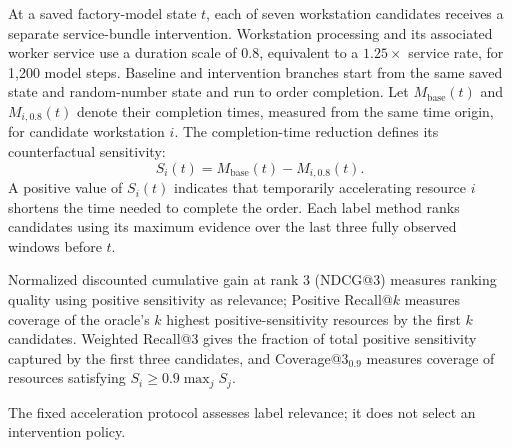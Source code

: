 \documentclass[a4paper,fleqn]{cas-dc}
\begin{document}
At a saved factory-model state $t$, each of seven workstation candidates receives a separate service-bundle intervention. Workstation processing and its associated worker service use a duration scale of $0.8$, equivalent to a $1.25\times$ service rate, for 1,200 model steps. Baseline and intervention branches start from the same saved state and random-number state and run to order completion. Let $M_{\mathrm{base}}(t)$ and $M_{i,0.8}(t)$ denote their completion times, measured from the same time origin, for candidate workstation $i$. The completion-time reduction defines its counterfactual sensitivity:
\begin{equation}
S_i(t)=M_{\mathrm{base}}(t)-M_{i,0.8}(t).
\end{equation}
A positive value of $S_i(t)$ indicates that temporarily accelerating resource $i$ shortens the time needed to complete the order. Each label method ranks candidates using its maximum evidence over the last three fully observed windows before $t$.

Normalized discounted cumulative gain at rank 3 (NDCG@3) measures ranking quality using positive sensitivity as relevance; Positive Recall@$k$ measures coverage of the oracle's $k$ highest positive-sensitivity resources by the first $k$ candidates. Weighted Recall@3 gives the fraction of total positive sensitivity captured by the first three candidates, and Coverage@3$_{0.9}$ measures coverage of resources satisfying $S_i\geq0.9\max_j S_j$.

The fixed acceleration protocol assesses label relevance; it does not select an intervention policy.

\FloatBarrier
\setcounter{topnumber}{4}
\setcounter{bottomnumber}{3}
\setcounter{totalnumber}{7}
\setcounter{dbltopnumber}{4}
\renewcommand{\topfraction}{0.9}
\renewcommand{\bottomfraction}{0.85}
\renewcommand{\textfraction}{0.08}
\renewcommand{\floatpagefraction}{0.7}
\renewcommand{\dbltopfraction}{0.9}
\renewcommand{\dblfloatpagefraction}{0.85}
\setlength{\floatsep}{10pt plus 2pt minus 2pt}
\setlength{\textfloatsep}{12pt plus 2pt minus 3pt}
\setlength{\dblfloatsep}{10pt plus 2pt minus 2pt}
\setlength{\dbltextfloatsep}{12pt plus 2pt minus 3pt}
\makeatletter
\def\@dbflt#1{\@ifnextchar[{\@xdblfloat{#1}}{%
  \edef\reserved@a{\noexpand\@xdblfloat{#1}[\csname fps@#1\endcsname]}%
  \reserved@a}}
\setlength{\@fpsep}{12pt plus 2pt minus 2pt}
\setlength{\@dblfpsep}{12pt plus 2pt minus 2pt}
\makeatother
\raggedbottom
\end{document}
